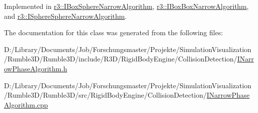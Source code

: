Implemented in \mbox{\hyperlink{classr3_1_1_i_box_sphere_narrow_algorithm_aeecdb2486c6e6cbae057466f05323bdb}{r3\+::\+I\+Box\+Sphere\+Narrow\+Algorithm}}, \mbox{\hyperlink{classr3_1_1_i_box_box_narrow_algorithm_a4b06ee2be38c248c59195082db64c3e3}{r3\+::\+I\+Box\+Box\+Narrow\+Algorithm}}, and \mbox{\hyperlink{classr3_1_1_i_sphere_sphere_narrow_algorithm_acfdb8ae3db8c91843216651768cbd4e2}{r3\+::\+I\+Sphere\+Sphere\+Narrow\+Algorithm}}.



The documentation for this class was generated from the following files\+:\begin{DoxyCompactItemize}
\item 
D\+:/\+Library/\+Documents/\+Job/\+Forschungsmaster/\+Projekte/\+Simulation\+Visualization/\+Rumble3\+D/\+Rumble3\+D/include/\+R3\+D/\+Rigid\+Body\+Engine/\+Collision\+Detection/\mbox{\hyperlink{_i_narrow_phase_algorithm_8h}{I\+Narrow\+Phase\+Algorithm.\+h}}\item 
D\+:/\+Library/\+Documents/\+Job/\+Forschungsmaster/\+Projekte/\+Simulation\+Visualization/\+Rumble3\+D/\+Rumble3\+D/src/\+Rigid\+Body\+Engine/\+Collision\+Detection/\mbox{\hyperlink{_i_narrow_phase_algorithm_8cpp}{I\+Narrow\+Phase\+Algorithm.\+cpp}}\end{DoxyCompactItemize}
